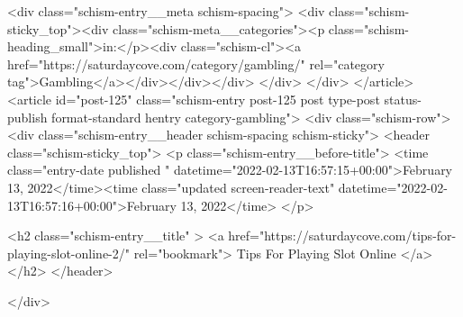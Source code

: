 {		<div class="schism-entry__meta schism-spacing">			<div class="schism-sticky_top"><div class="schism-meta__categories"><p class="schism-heading_small">in:</p><div class="schism-cl"><a href="https://saturdaycove.com/category/gambling/" rel="category tag">Gambling</a></div></div></div>		</div>
	</div>
</article>
<article id="post-125" class="schism-entry post-125 post type-post status-publish format-standard hentry category-gambling">
	<div class="schism-row">		<div class="schism-entry__header schism-spacing schism-sticky">			<header class="schism-sticky_top">				<p class="schism-entry__before-title">
					<time class="entry-date published " datetime="2022-02-13T16:57:15+00:00">February 13, 2022</time><time class="updated screen-reader-text" datetime="2022-02-13T16:57:16+00:00">February 13, 2022</time>				</p>

				<h2 class="schism-entry__title" >
					<a href="https://saturdaycove.com/tips-for-playing-slot-online-2/" rel="bookmark">
						Tips For Playing Slot Online					</a>
				</h2>
			</header>

					</div>

}
